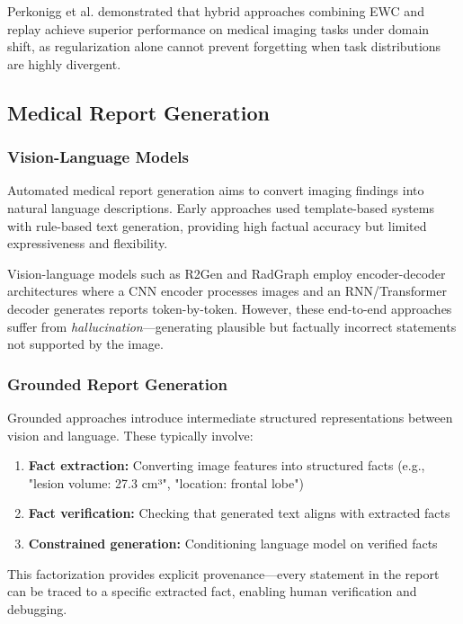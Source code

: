 \documentclass[conference]{IEEEtran}
\begin{document}
Perkonigg et al. \cite{perkonigg2021continual} demonstrated that hybrid approaches combining EWC and replay achieve superior performance on medical imaging tasks under domain shift, as regularization alone cannot prevent forgetting when task distributions are highly divergent.

\subsection{Medical Report Generation}

\subsubsection{Vision-Language Models}

Automated medical report generation aims to convert imaging findings into natural language descriptions. Early approaches used template-based systems with rule-based text generation, providing high factual accuracy but limited expressiveness and flexibility.

Vision-language models such as R2Gen \cite{chen2020r2gen} and RadGraph \cite{jain2021radgraph} employ encoder-decoder architectures where a CNN encoder processes images and an RNN/Transformer decoder generates reports token-by-token. However, these end-to-end approaches suffer from \textit{hallucination}—generating plausible but factually incorrect statements not supported by the image.

\subsubsection{Grounded Report Generation}

Grounded approaches \cite{zhang2023radiology} introduce intermediate structured representations between vision and language. These typically involve:

\begin{enumerate}
\item \textbf{Fact extraction:} Converting image features into structured facts (e.g., "lesion volume: 27.3 cm³", "location: frontal lobe")
\item \textbf{Fact verification:} Checking that generated text aligns with extracted facts
\item \textbf{Constrained generation:} Conditioning language model on verified facts
\end{enumerate}

This factorization provides explicit provenance—every statement in the report can be traced to a specific extracted fact, enabling human verification and debugging.
\end{document}
